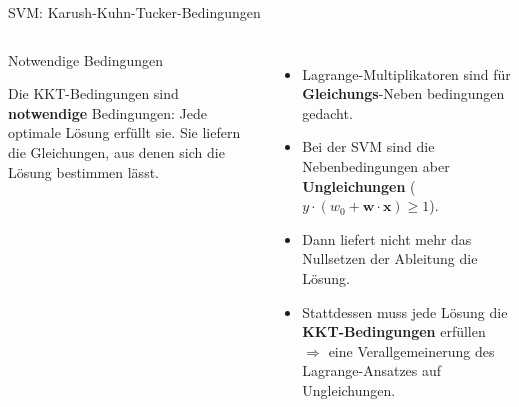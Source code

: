 \begin{frame}{SVM: Karush-Kuhn-Tucker-Bedingungen}
\begin{columns}

\begin{blockC2}{Notwendige Bedingungen}

Die KKT-Bedingungen sind \textbf{notwendige} Bedingungen: Jede optimale
Lösung erfüllt sie. Sie liefern die Gleichungen, aus denen sich die Lösung
bestimmen lässt.
\end{blockC2}


\begin{itemize}
  \item Lagrange-Multiplikatoren sind für \textbf{Gleichungs}-Neben\-%
        bedingungen gedacht.
  \item Bei der SVM sind die Nebenbedingungen aber \textbf{Ungleichungen}
        ($y \cdot (w_0 + \mathbf{w}\cdot\mathbf{x}) \geq 1$).
  \item Dann liefert nicht mehr das Nullsetzen der Ableitung die Lösung.
  \item Stattdessen muss jede Lösung die \textbf{KKT-Bedingungen} erfüllen
        $\Rightarrow$ eine Verallgemeinerung des Lagrange-Ansatzes auf Ungleichungen.
\end{itemize}


\end{columns}
\end{frame}


